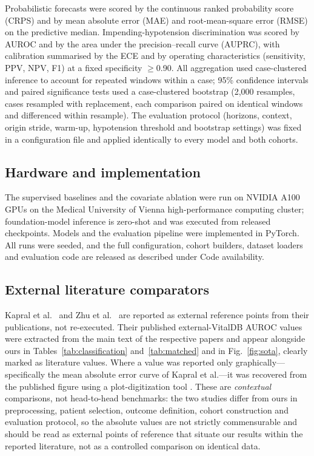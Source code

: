 \documentclass[11pt]{article}
\begin{document}
Probabilistic forecasts were scored by the continuous ranked probability
score (CRPS) and by mean absolute error (MAE) and root-mean-square error
(RMSE) on the predictive median. Impending-hypotension discrimination was
scored by AUROC and by the area under the precision--recall curve (AUPRC),
with calibration summarised by the ECE and by operating characteristics (sensitivity,
PPV, NPV, F1) at a fixed specificity $\geq$0.90. All aggregation used
case-clustered inference to account for repeated windows within a case; 95\%
confidence intervals and paired significance tests used a case-clustered
bootstrap (2{,}000 resamples, cases resampled with replacement, each
comparison paired on identical windows and differenced within resample).
The evaluation protocol (horizons, context, origin stride, warm-up,
hypotension threshold and bootstrap settings) was fixed in a configuration
file and applied identically to every model and both cohorts.

\subsection{Hardware and implementation}

The supervised baselines and the covariate ablation were run on NVIDIA A100
GPUs on the Medical University of Vienna high-performance computing cluster;
foundation-model inference is zero-shot and was executed from released
checkpoints. Models and the evaluation pipeline were implemented in PyTorch.
All runs were seeded, and the full configuration, cohort builders, dataset
loaders and evaluation code are released as described under Code
availability.

\subsection{External literature comparators}

Kapral et al.\ \citep{Kapral2024} and Zhu et al.\ \citep{Zhu2026} are
reported as external reference points from their publications, not
re-executed. Their published external-VitalDB AUROC values were extracted
from the main text of the respective papers and appear alongside ours in
Tables~\ref{tab:classification} and~\ref{tab:matched} and in
Fig.~\ref{fig:sota}, clearly marked as literature values. Where a value was
reported only graphically---specifically the mean absolute error curve of
Kapral et al.---it was recovered from the published figure using a
plot-digitization tool \citep{WebPlotDigitizer}. These are
\emph{contextual} comparisons, not head-to-head benchmarks: the two studies
differ from ours in preprocessing, patient selection, outcome definition,
cohort construction and evaluation protocol, so the absolute values are not
strictly commensurable and should be read as external points of reference
that situate our results within the reported literature, not as a controlled
comparison on identical data.
\end{document}
